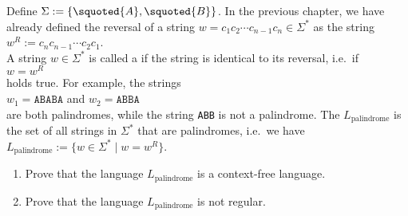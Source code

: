 \exerciseEng
Define $\Sigma := \{ \squoted{A}, \squoted{B} \}$. 
In the previous chapter, we have already defined the reversal of a string 
$w = c_1 c_2 \cdots c_{n-1} c_n \in \Sigma^*$ as the string
\\[0.2cm]
\hspace*{1.3cm}
$w^R := c_n c_{n-1} \cdots c_2 c_1$.
\\[0.2cm]
A string $w \in \Sigma^*$ is called a
\href{http://en.wikipedia.org/wiki/Palindrome}{}  if the string is identical to its
reversal, i.e.~if
\\[0.2cm]
\hspace*{1.3cm}
$w = w^R$
\\[0.2cm]
holds true.  For example, the strings 
\\[0.2cm]
\hspace*{1.3cm}
$w_1 = \mathtt{ABABA}$ \quad and \quad $w_2 = \mathtt{ABBA}$
\\[0.2cm]
are both palindromes, while the string \texttt{ABB} is not a palindrome. The 
 $L_\mathrm{palindrome}$ is the set of all 
strings in $\Sigma^*$ that are palindromes, i.e.~we have
\\[0.2cm]
\hspace*{1.3cm}
$L_\mathrm{palindrome} := \bigr\{ w \in \Sigma^* \mid w = w^R \bigr\}$.
\renewcommand{\labelenumi}{(\alph{enumi})}
\begin{enumerate}
\item Prove that the language $L_\mathrm{palindrome}$ is a context-free language.
\item Prove that the language $L_\mathrm{palindrome}$ is not regular.  \eox
\end{enumerate}
\renewcommand{\labelenumi}{\arabic{enumi}.}

 




